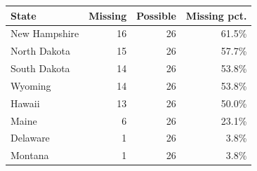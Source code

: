 \begin{center}
\begin{tabular}{lrrr}
\toprule
State & Missing & Possible & Missing pct. \\
\midrule
New Hampshire & 16 & 26 & 61.5\% \\
North Dakota & 15 & 26 & 57.7\% \\
South Dakota & 14 & 26 & 53.8\% \\
Wyoming & 14 & 26 & 53.8\% \\
Hawaii & 13 & 26 & 50.0\% \\
Maine & 6 & 26 & 23.1\% \\
Delaware & 1 & 26 & 3.8\% \\
Montana & 1 & 26 & 3.8\% \\
\bottomrule
\end{tabular}
\end{center}
